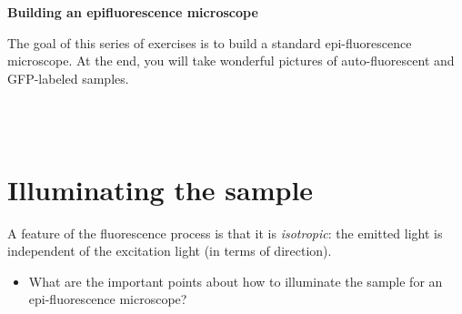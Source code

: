 \documentclass[a4paper]{report}
\begin{document}
	
	\setcounter{secnumdepth}{2}
	
	\begin{center}
		\textbf{\Large{Building an epifluorescence microscope}}
	\end{center}
	
	\vspace{0.8cm}
	\noindent The goal of this series of exercises is to build a standard epi-fluorescence microscope. At the end, you will take wonderful pictures of auto-fluorescent and GFP-labeled samples.
	
	\\
	\\


	\section{Illuminating the sample}
	\hypertarget{hintBack-illumination}{}
	A feature of the fluorescence process is that it is \emph{isotropic}: the emitted light is independent of the excitation light (in terms of direction). 
	\begin{itemize}
	    \item What are the important points about how to illuminate the sample for an epi-fluorescence microscope?
    \end{itemize}
    
\end{document}
